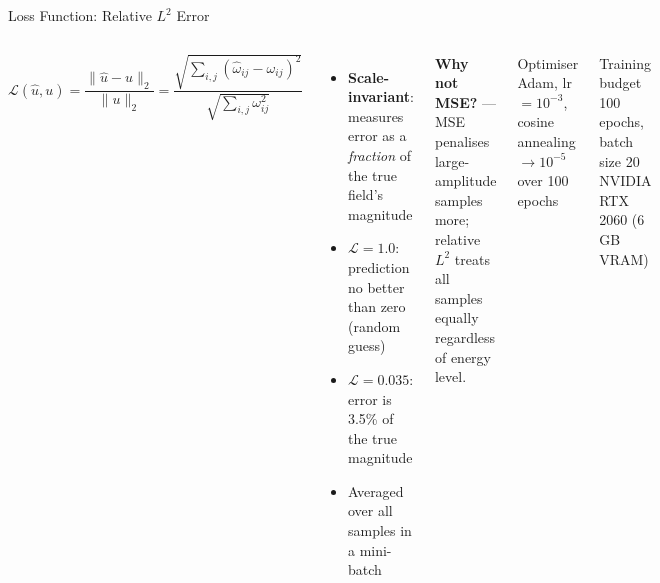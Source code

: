 \documentclass[aspectratio=169, 11pt]{beamer}
\begin{document}
\begin{frame}{Loss Function: Relative $L^2$ Error}
  \begin{columns}[t]
      \[
        \mathcal{L}(\hat{u}, u)
        = \frac{\|\hat{u} - u\|_2}{\|u\|_2}
        = \frac{\sqrt{\sum_{i,j}(\hat{\omega}_{ij}-\omega_{ij})^2}}
               {\sqrt{\sum_{i,j}\omega_{ij}^2}}
      \]
      \vspace{0.3em}
      \begin{itemize}
        \item \textbf{Scale-invariant}: measures error as a \emph{fraction} of
              the true field's magnitude
        \item $\mathcal{L}=1.0$: prediction no better than zero (random guess)
        \item $\mathcal{L}=0.035$: error is 3.5\% of the true magnitude
        \item Averaged over all samples in a mini-batch
      \end{itemize}
      \vspace{0.3em}
      \textbf{Why not MSE?} --- MSE penalises large-amplitude samples more;
      relative $L^2$ treats all samples equally regardless of energy level.
      \begin{block}{Optimiser}
        Adam, lr $= 10^{-3}$, cosine annealing $\to 10^{-5}$ over 100 epochs
      \end{block}
      \vspace{0.4em}
      \begin{block}{Training budget}
        100 epochs, batch size 20\\
        NVIDIA RTX 2060 (6 GB VRAM)
      \end{block}
  \end{columns}
\end{frame}
\end{document}
